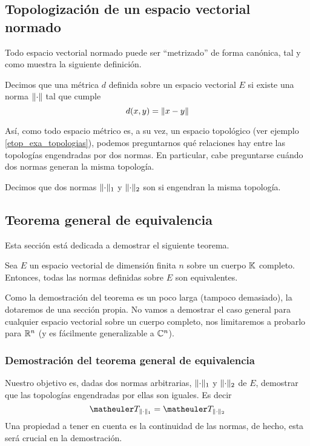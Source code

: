 \subsection{Topologización de un espacio vectorial normado}
Todo espacio vectorial normado puede ser ``metrizado'' de forma canónica, tal y como muestra la siguiente definición.
\begin{defi}
	Decimos que una métrica $d$ definida sobre un espacio vectorial $E$  si existe una norma $\lVert\cdot\rVert$ tal que cumple
	\begin{equation*}
		d(x,y)=\lVert x-y\rVert
	\end{equation*}
\end{defi}
Así, como todo espacio métrico es, a su vez, un espacio topológico (ver ejemplo \ref{etop_exa_topologias}), podemos preguntarnos qué relaciones hay entre las topologías engendradas por dos normas. En particular, cabe preguntarse cuándo dos normas generan la misma topología.
\begin{defi}
	Decimos que dos normas $\lVert\cdot\rVert_1$ y $\lVert\cdot\rVert_2$ son  si engendran la misma topología.
\end{defi}
\subsection{Teorema general de equivalencia}
Esta sección está dedicada a demostrar el siguiente teorema.
\begin{theo}
	Sea $E$ un espacio vectorial de dimensión finita $n$ sobre un cuerpo $\mathbb{K}$ completo. Entonces, todas las normas definidas sobre $E$ son equivalentes.
\end{theo}
Como la demostración del teorema es un poco larga (tampoco demasiado), la dotaremos de una sección propia. No vamos a demostrar el caso general para cualquier espacio vectorial sobre un cuerpo completo, nos limitaremos a probarlo para $\mathbb{R}^n$ (y es fácilmente generalizable a $\mathbb{C}^n$).

\subsubsection{Demostración del teorema general de equivalencia}
Nuestro objetivo es, dadas dos normas arbitrarias, $\lVert\cdot\rVert_1$ y $\lVert\cdot\rVert_2$ de $E$, demostrar que las topologías engendradas por ellas son iguales. Es decir
\begin{equation*}
\T_{\norm{\cdot}_1}=\T_{\norm{\cdot}_2}
\end{equation*}
Una propiedad a tener en cuenta es la continuidad de las normas, de hecho, esta será crucial en la demostración.

